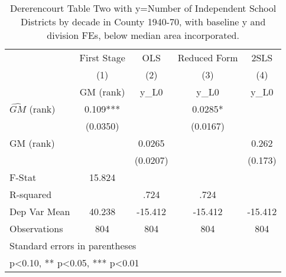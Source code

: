 \begin{table}[htbp]\centering
\def\sym#1{\ifmmode^{#1}\else\(^{#1}\)\fi}
\caption{Dererencourt Table Two with y=Number of Independent School Districts by decade in County 1940-70, with baseline y and division FEs, below median area incorporated.}
\begin{tabular}{l*{4}{c}}
\toprule
                    & First Stage   &         OLS   &Reduced Form   &        2SLS   \\
                    &\multicolumn{1}{c}{(1)}&\multicolumn{1}{c}{(2)}&\multicolumn{1}{c}{(3)}&\multicolumn{1}{c}{(4)}\\
                    &\multicolumn{1}{c}{GM  (rank)}&\multicolumn{1}{c}{y\_L0}&\multicolumn{1}{c}{y\_L0}&\multicolumn{1}{c}{y\_L0}\\
\midrule
$\hat{GM}$ (rank)   &       0.109***&               &      0.0285*  &               \\
                    &    (0.0350)   &               &    (0.0167)   &               \\
\addlinespace
GM  (rank)          &               &      0.0265   &               &       0.262   \\
                    &               &    (0.0207)   &               &     (0.173)   \\
\midrule
F-Stat              &      15.824   &               &               &               \\
R-squared           &               &        .724   &        .724   &               \\
Dep Var Mean        &      40.238   &     -15.412   &     -15.412   &     -15.412   \\
Observations        &         804   &         804   &         804   &         804   \\
\bottomrule
\multicolumn{5}{l}{\footnotesize Standard errors in parentheses}\\
\multicolumn{5}{l}{\footnotesize * p<0.10, ** p<0.05, *** p<0.01}\\
\end{tabular}
\end{table}
